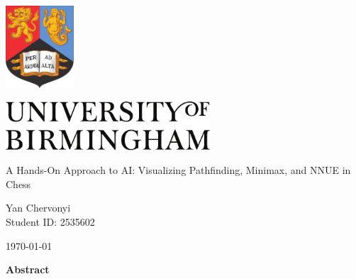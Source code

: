 \documentclass[12pt,a4paper]{article}
\begin{document}
\onehalfspacing        %

\author{Your Name \\ \small{Student ID: 123456}}
\date{\today}

\begin{titlepage}
\begin{center}
\includegraphics[width=1in]{figures/bham_crest}
\vspace{0.3in}

\includegraphics[width=3in]{figures/bham_logo}

\vspace{2in}

{\LARGE A Hands-On Approach to AI: Visualizing Pathfinding, Minimax, and NNUE in Chess }

{\Large Yan Chervonyi \\ \small{Student ID: 2535602}} 

\vspace{1cm}

\today  %

\end{center}
\end{titlepage}



\tableofcontents

\newpage
{}
{}

\begin{center}
    \LARGE \bfseries Abstract
\end{center}
\end{document}
